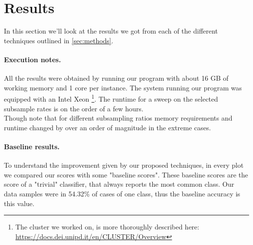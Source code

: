 \section{Results}
\label{sec:results}
In this section we'll look at the results we got from each of the different techniques outlined in \autoref{sec:methods}.

\paragraph{Execution notes.}
All the results were obtained by running our program with about 16 GB of working memory and 1 core per instance. The system running our program was equipped with an Intel Xeon \footnote{The cluster we worked on, is more thoroughly described here: \url{https://docs.dei.unipd.it/en/CLUSTER/Overview}}. The runtime for a sweep on the selected subsample rates is on the order of a few hours. \\
Though note that for different subsampling ratios memory requirements and runtime changed by over an order of magnitude in the extreme cases.


\paragraph{Baseline results.} To understand the improvement given by our proposed techniques, in every plot we compared our scores with some "baseline scores". These baseline scores are the score of a "trivial" classifier, that always reports the most common class.
Our data samples were in 54.32\% of cases of one class, thus the baseline accuracy is this value.

